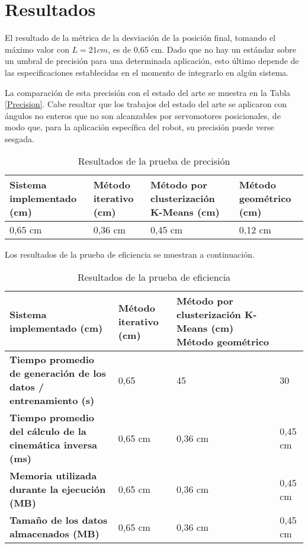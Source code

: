 \section{Resultados}

El resultado de la métrica de la desviación de la posición final, tomando el máximo valor con $L = 21 cm$, es de 0,65 cm. Dado que no hay un estándar sobre un umbral de precisión para una determinada aplicación, esto último depende de las especificaciones establecidas en el momento de integrarlo en algún sistema.

La comparación de esta precisión con el estado del arte se muestra en la Tabla \ref{Precision}. Cabe resaltar que los trabajos del estado del arte se aplicaron con ángulos no enteros que no son alcanzables por servomotores posicionales, de modo que, para la aplicación específica del robot, su precisión puede verse sesgada.

\begin{table}[ht]
	\centering
	\begin{tabular}{p{5cm}p{4cm}p{3.6cm}p{4cm}}
		\hline
		\textbf{Sistema implementado (cm)} & \textbf{Método iterativo (cm)} & \textbf{Método por clusterización K-Means (cm)} & \textbf{Método geométrico (cm)} \\
		\hline
		0,65 cm & 0,36 cm & 0,45 cm & 0,12 cm \\
		\hline
	\end{tabular}
	\caption{Resultados de la prueba de precisión}
	\label{tab:Precision}
\end{table}

Los resultados de la prueba de eficiencia se muestran a continuación.

\begin{table}[ht]
	\centering
	\begin{tabular}{p{5cm}p{4cm}p{3.6cm}p{4cm}}
		\hline
	    \textbf{Sistema implementado (cm)} & \textbf{Método iterativo (cm)} & \textbf{Método por clusterización K-Means (cm)} \textbf{Método geométrico} \\
		\hline
		\textbf{Tiempo promedio de generación de los datos / entrenamiento (s)} & 0,65 & 45 & 30 \\
		\textbf{Tiempo promedio del cálculo de la cinemática inversa (ms)} & 0,65 cm & 0,36 cm & 0,45 cm \\
		\textbf{Memoria utilizada durante la ejecución (MB)} & 0,65 cm & 0,36 cm & 0,45 cm \\
		\textbf{Tamaño de los datos almacenados (MB)} & 0,65 cm & 0,36 cm & 0,45 cm \\
		\hline
	\end{tabular}
	\caption{Resultados de la prueba de eficiencia}
	\label{tab:Precision}
\end{table}
